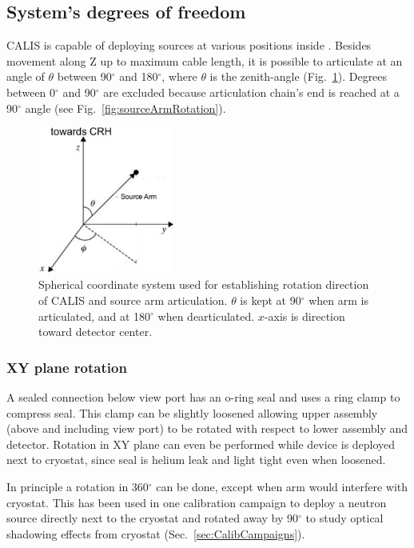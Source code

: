 \subsection{System's degrees of freedom}

CALIS is capable of deploying sources at various positions inside \lsv. Besides movement along Z up to maximum cable length, it is possible to articulate at an angle of $\theta$ between 90$^{\circ}$ and 180$^{\circ}$, where $\theta$ is the zenith-angle (Fig.~\ref{fig:coordinate_system}). Degrees between 0$^{\circ}$ and 90$^{\circ}$ are excluded because articulation chain's end is reached at a 90$^{\circ}$ angle (see Fig.~\ref{fig:sourceArmRotation}).

\begin{figure}[htbp]
 \centering
  \includegraphics[width=0.4\textwidth]{Figures/coordinate_system}
  \caption{Spherical coordinate system used for establishing rotation direction of CALIS and source arm articulation. $\theta$ is kept at 90$^{\circ}$ when arm is articulated, and at 180$^{\circ}$ when dearticulated. $x$-axis is direction toward detector center. }
  \label{fig:coordinate_system}
\end{figure} 

\subsubsection{XY plane rotation}\label{sec:XYrotation}
A sealed connection below view port has an o-ring seal and uses a ring clamp to compress seal. This clamp can be slightly loosened allowing upper assembly (above and including view port) to be rotated with respect to lower assembly and detector. Rotation in XY plane can even be performed while device is deployed next to cryostat, since seal is helium leak and light tight even when loosened.

In principle a rotation in 360$^\circ$ can be done, except when arm would interfere with cryostat. This has been used in one calibration campaign to deploy a neutron source directly next to the cryostat and rotated away by 90$^\circ$ to study optical shadowing effects from cryostat (Sec.~\ref{sec:CalibCampaigns}). 



